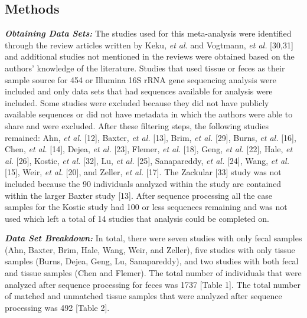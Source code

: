 \documentclass[12pt,]{article}
\begin{document}
\newpage

\subsection{Methods}\label{methods}

\textbf{\emph{Obtaining Data Sets:}} The studies used for this
meta-analysis were identified through the review articles written by
Keku, \emph{et al.} and Vogtmann, \emph{et al.} {[}30,31{]} and
additional studies not mentioned in the reviews were obtained based on
the authors' knowledge of the literature. Studies that used tissue or
feces as their sample source for 454 or Illumina 16S rRNA gene
sequencing analysis were included and only data sets that had sequences
available for analysis were included. Some studies were excluded because
they did not have publicly available sequences or did not have metadata
in which the authors were able to share and were excluded. After these
filtering steps, the following studies remained: Ahn, \emph{et al.}
{[}12{]}, Baxter, \emph{et al.} {[}13{]}, Brim, \emph{et al.} {[}29{]},
Burns, \emph{et al.} {[}16{]}, Chen, \emph{et al.} {[}14{]}, Dejea,
\emph{et al.} {[}23{]}, Flemer, \emph{et al.} {[}18{]}, Geng, \emph{et
al.} {[}22{]}, Hale, \emph{et al.} {[}26{]}, Kostic, \emph{et al.}
{[}32{]}, Lu, \emph{et al.} {[}25{]}, Sanapareddy, \emph{et al.}
{[}24{]}, Wang, \emph{et al.} {[}15{]}, Weir, \emph{et al.} {[}20{]},
and Zeller, \emph{et al.} {[}17{]}. The Zackular {[}33{]} study was not
included because the 90 individuals analyzed within the study are
contained within the larger Baxter study {[}13{]}. After sequence
processing all the case samples for the Kostic study had 100 or less
sequences remaining and was not used which left a total of 14 studies
that analysis could be completed on.

\textbf{\emph{Data Set Breakdown:}} In total, there were seven studies
with only fecal samples (Ahn, Baxter, Brim, Hale, Wang, Weir, and
Zeller), five studies with only tissue samples (Burns, Dejea, Geng, Lu,
Sanapareddy), and two studies with both fecal and tissue samples (Chen
and Flemer). The total number of individuals that were analyzed after
sequence processing for feces was 1737 {[}Table 1{]}. The total number
of matched and unmatched tissue samples that were analyzed after
sequence processing was 492 {[}Table 2{]}.
\end{document}
